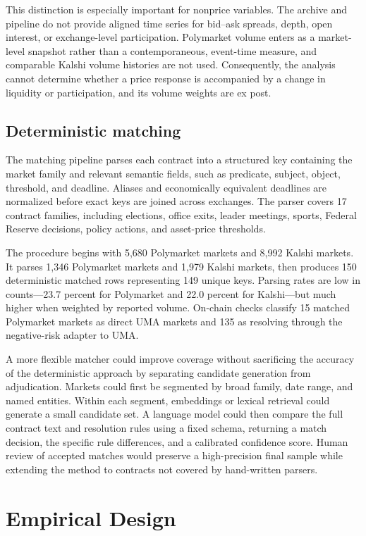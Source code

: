 \documentclass[11pt]{article}
\begin{document}
This distinction is especially important for nonprice variables. The archive and
pipeline do not provide aligned time series for bid--ask spreads, depth, open interest, or
exchange-level participation. Polymarket volume enters as a market-level snapshot rather
than a contemporaneous, event-time measure, and comparable Kalshi volume histories are not
used. Consequently, the analysis cannot determine whether a price response is
accompanied by a change in liquidity or participation, and its volume weights are ex post.

\subsection{Deterministic matching}

The matching pipeline parses each contract into a structured key containing the market
family and relevant semantic fields, such as predicate, subject, object, threshold, and
deadline. Aliases and economically equivalent deadlines are normalized before exact keys
are joined across exchanges. The parser covers 17 contract families, including
elections, office exits, leader meetings, sports, Federal Reserve decisions, policy actions,
and asset-price thresholds.

The procedure begins with 5,680 Polymarket markets and 8,992 Kalshi markets. It parses 1,346
Polymarket markets and 1,979 Kalshi markets, then produces 150 deterministic matched rows
representing 149 unique keys. Parsing rates are low in counts---23.7 percent for Polymarket
and 22.0 percent for Kalshi---but much higher when weighted by reported volume. On-chain
checks classify 15 matched Polymarket markets as direct UMA markets and 135 as resolving
through the negative-risk adapter to UMA.

A more flexible matcher could improve coverage without sacrificing the accuracy of the
deterministic approach by separating candidate generation from adjudication.
Markets could first be segmented by broad family, date range, and named entities. Within
each segment, embeddings or lexical retrieval could generate a small candidate set. A
language model could then compare the full contract text and resolution rules using a fixed
schema, returning a match decision, the specific rule differences, and a calibrated
confidence score. Human review of accepted matches would preserve a high-precision final
sample while extending the method to contracts not covered by hand-written parsers.

\section{Empirical Design}
\end{document}
